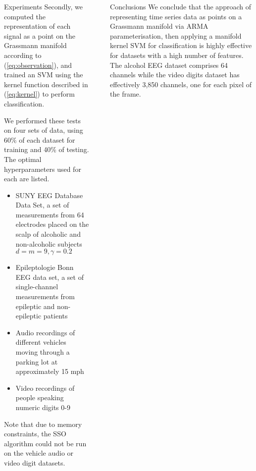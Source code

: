 \documentclass[final]{beamer}
\newlength{\sepwid}
\newlength{\onecolwid}
\newlength{\twocolwid}
\begin{document}
\begin{frame}[t]
\begin{columns}[t]
\begin{column}{\twocolwid}
\begin{columns}[t,totalwidth=\twocolwid]
\begin{column}{\onecolwid}
\begin{block}{Experiments}
    Secondly, we computed the representation of each signal as a point on the Grassmann manifold
    according to (\ref{eq:observation}), and trained an SVM using the kernel function described in
    (\ref{eq:kernel}) to perform classification.

    We performed these tests on four sets of data, using 60\% of each dataset for training and 40\%
    of testing. The optimal hyperparameters used for each are listed.
    \begin{itemize}
        \item SUNY EEG Database Data Set, a set of measurements from 64 electrodes placed on
            the scalp of alcoholic and non-alcoholic subjects \cite{zhang_event_1995} \\
            $d = m = 9, \gamma = 0.2$
        \item Epileptologie Bonn EEG data set, a set of single-channel measurements from epileptic
            and non-epileptic patients \cite{andrzejak_indications_2001}
        \item Audio recordings of different vehicles moving through a parking lot at approximately
            15 mph \cite{sunu_dimensionality_2018}
        \item Video recordings of people speaking numeric digits 0-9 \cite{lieu_signal_2011}
    \end{itemize}

    Note that due to memory constraints, the SSO algorithm could not be run on the vehicle audio or
    video digit datasets.
\end{block}


\end{column}    %

\begin{column}{\sepwid}\end{column} %

\begin{column}{\onecolwid}\vspace{-.6in}  %


\begin{block}{Conclusions}
    We conclude that the approach of representing time series data as points on a Grassmann manifold
    via ARMA parameterisation, then applying a manifold kernel SVM for classification is highly
    effective for datasets with a high number of features. The alcohol EEG dataset comprises 64
    channels while the video digits dataset has effectively 3,850 channels, one for each pixel of
    the frame.


\end{block}
\end{column}
\end{columns}
\end{column}
\end{columns}
\end{frame}
\end{document}
